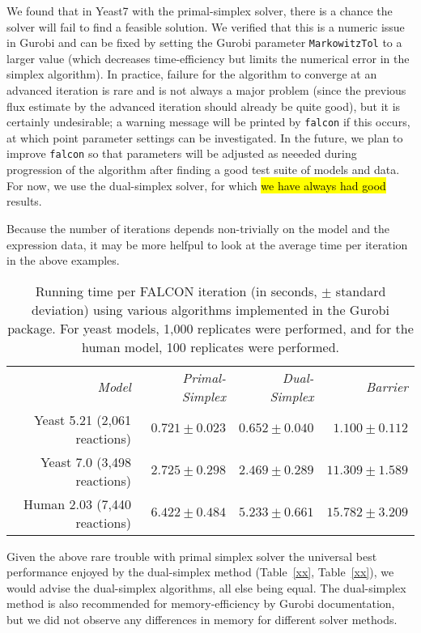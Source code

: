 We found that in Yeast7 with the primal-simplex solver, there is a
chance the solver will fail to find a feasible solution.
We verified that this is a numeric issue
in Gurobi and can be fixed by setting the Gurobi parameter
\texttt{MarkowitzTol} to a larger value (which decreases
time-efficiency but limits the numerical error in the
simplex algorithm). In practice, failure for the algorithm to converge
at an advanced iteration is rare and is not always a major problem (since the previous
flux estimate by the advanced iteration should already be quite good), but it
is certainly undesirable; a warning message will be printed by
\texttt{falcon} if this occurs, at which point parameter settings can
be investigated. In the future, we plan to improve \texttt{falcon} so
that parameters will be adjusted as neeeded during progression of the
algorithm after finding a good test suite of models and data. For now,
we use the dual-simplex solver, for which \hl{we have always had good}
results.

Because the number of iterations depends non-trivially on the model
and the expression data, it may be more helfpul to look at the 
average time per iteration in the above examples.

\begin{table}
\begin{center}
\begin{tabular}{rrrr}
\emph{Model}                 & \emph{Primal-Simplex} & \emph{Dual-Simplex} & \emph{Barrier} \\
Yeast 5.21 (2,061 reactions) & $ 0.721 \pm 0.023 $ & $ 0.652 \pm 0.040 $ & $ 1.100 \pm 0.112  $\\ 
Yeast 7.0 (3,498 reactions)  & $ 2.725 \pm 0.298 $ & $ 2.469 \pm 0.289 $ & $ 11.309 \pm 1.589 $\\
Human 2.03 (7,440 reactions) & $ 6.422 \pm 0.484 $ & $ 5.233 \pm 0.661 $ & $ 15.782 \pm 3.209 $\\ 
\end{tabular}
\end{center}
\caption{Running time per FALCON iteration (in seconds, $\pm$ standard
  deviation) using various algorithms implemented in the Gurobi
  package.  For yeast models, 1,000 replicates were performed, and for
  the human model, 100 replicates were performed.}
\label{tab:methodTimeIter}
\end{table}

Given the above rare trouble with primal simplex solver the universal
best performance enjoyed by the dual-simplex method (Table~\ref{xx},
Table~\ref{xx}), we would advise the dual-simplex algorithms, all else
being equal. The dual-simplex method is also recommended for
memory-efficiency by Gurobi documentation, but we did not observe any
differences in memory for different solver methods.

